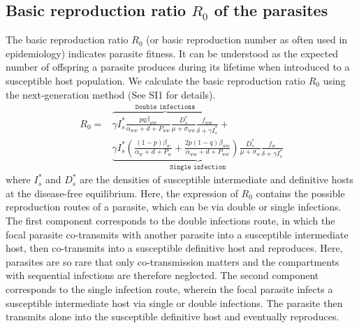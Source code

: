 \documentclass[11pt]{article}
\begin{document}
\subsection*{Basic reproduction ratio $R_0$ of the parasites}

The basic reproduction ratio $R_0$ (or basic reproduction number as often used in epidemiology) indicates parasite fitness. 
It can be understood as the expected number of offspring a parasite produces during its lifetime when introduced to a susceptible host population. 
We calculate the basic reproduction ratio $R_0$ using the next-generation method \citep{Diekmann1990, Diekmann2009, hurford:JRSI:2010} (See SI1 for details).
%
\begin{align}
R_0 = & \overbrace{\gamma I_s^* \frac{ p q \beta_{ww}}{\alpha_{ww} + d + P_{ww}} \frac{D_s^*}{\mu +\sigma_{ww}} \frac{f_{ww}}{\delta +\gamma I_s^*}}^{ \texttt{Double infections}} + \nonumber \\
& \underbrace{\gamma  I_s^* \left( \frac{ (1-p)\beta_w}{\alpha_w + d + P_w} + \frac{2 p (1-q) \beta_{ww}}{\alpha_{ww} + d + P_{ww}} \right) \frac{D_s^*}{\mu + \sigma_w} \frac{f_w}{\delta +\gamma  I_s^*}}_{\texttt{Single infection}}
\end{align}
%
where $I_s^*$ and $D_s^*$ are the densities of susceptible intermediate and definitive hosts at the disease-free equilibrium. 
Here, the expression of $R_0$ contains the possible reproduction routes of a parasite, which can be via double or single infections. 
The first component corresponds to the double infections route, in which the focal parasite co-transmits with another parasite into a susceptible intermediate host, then co-transmits into a susceptible definitive host and reproduces. 
Here, parasites are so rare that only co-transmission matters and the compartments with sequential infections are therefore neglected. 
The second component corresponds to the single infection route, wherein the focal parasite infects a susceptible intermediate host via single or double infections. 
The parasite then transmits alone into the susceptible definitive host and eventually reproduces. 
\end{document}
